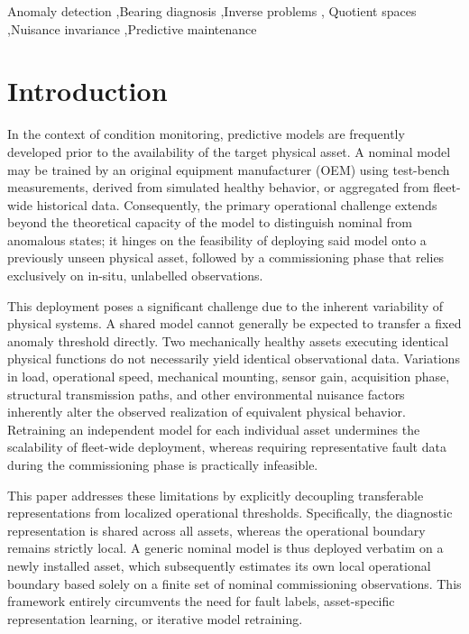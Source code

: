 \documentclass[a4paper]{cas-sc}
\begin{document}
\begin{keywords}
Anomaly detection \sep Bearing diagnosis \sep Inverse problems \sep
Quotient spaces \sep Nuisance invariance \sep Predictive maintenance
\end{keywords}
 
\maketitle

\listofchanges


\section{Introduction}
\label{sec:introduction}

In the context of condition monitoring, predictive models are frequently developed prior to the availability of the target physical asset. A nominal model may be trained by an original equipment manufacturer (OEM) using test-bench measurements, derived from simulated healthy behavior, or aggregated from fleet-wide historical data. Consequently, the primary operational challenge extends beyond the theoretical capacity of the model to distinguish nominal from anomalous states; it hinges on the feasibility of deploying said model onto a previously unseen physical asset, followed by a commissioning phase that relies exclusively on in-situ, unlabelled observations.

This deployment poses a significant challenge due to the inherent variability of physical systems. A shared model cannot generally be expected to transfer a fixed anomaly threshold directly. Two mechanically healthy assets executing identical physical functions do not necessarily yield identical observational data. Variations in load, operational speed, mechanical mounting, sensor gain, acquisition phase, structural transmission paths, and other environmental nuisance factors inherently alter the observed realization of equivalent physical behavior. Retraining an independent model for each individual asset undermines the scalability of fleet-wide deployment, whereas requiring representative fault data during the commissioning phase is practically infeasible.

This paper addresses these limitations by explicitly decoupling transferable representations from localized operational thresholds. Specifically, the diagnostic representation is shared across all assets, whereas the operational boundary remains strictly local. A generic nominal model is thus deployed verbatim on a newly installed asset, which subsequently estimates its own local operational boundary based solely on a finite set of nominal commissioning observations. This framework entirely circumvents the need for fault labels, asset-specific representation learning, or iterative model retraining.
\end{document}
